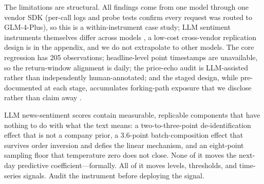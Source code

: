 \documentclass[11pt]{article}
\begin{document}
The limitations are structural. All findings come from one model through one vendor SDK (per-call logs and probe tests confirm every request was routed to GLM-4-Plus), so this is a within-instrument case study; LLM sentiment instruments themselves differ across models \citep{teles2025}, a low-cost cross-vendor replication design is in the appendix, and we do not extrapolate to other models. The core regression has 205 observations; headline-level point timestamps are unavailable, so the return-window alignment is daily; the price-echo audit is LLM-assisted rather than independently human-annotated; and the staged design, while pre-documented at each stage, accumulates forking-path exposure that we disclose rather than claim away \citep{romano2005}.

LLM news-sentiment scores contain measurable, replicable components that have nothing to do with what the text means: a two-to-three-point de-identification effect that is not a company prior, a 3.6-point batch-composition effect that survives order inversion and defies the linear mechanism, and an eight-point sampling floor that temperature zero does not close. None of it moves the next-day predictive coefficient---formally. All of it moves levels, thresholds, and time-series signals. Audit the instrument before deploying the signal.
\end{document}
